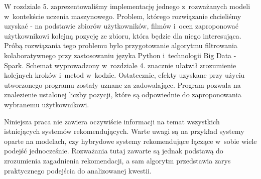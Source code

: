 \documentclass[12pt,a4paper]{report}
\begin{document}
W rozdziale 5. zaprezentowaliśmy implementację jednego z~rozważanych modeli w~kontekście uczenia maszynowego. Problem, którego rozwiązanie chcieliśmy uzyskać - na podstawie zbiorów użytkowników, filmów i~ocen zaproponować użytkownikowi kolejną pozycję ze zbioru, która będzie dla niego interesująca. Próbą rozwiązania tego problemu było przygotowanie algorytmu filtrowania kolaboratywnego przy zastosowaniu języka Python i~technologii Big Data - Spark. Schemat wyprowadzony w~rozdziale 4. znacznie ułatwił zrozumienie kolejnych kroków i~metod w~kodzie. Ostatecznie, efekty uzyskane przy użyciu utworzonego programu zostały uznane za zadowalające. Program pozwala na znalezienie ustalonej liczby pozycji, które są odpowiednie do zaproponowania wybranemu użytkownikowi. 

Niniejsza praca nie zawiera oczywiście informacji na temat wszystkich istniejących systemów rekomendujących. Warte uwagi są na przykład systemy oparte na modelach, czy hybrydowe systemy rekomendujące łączące w~sobie wiele podejść jednocześnie. Rozważania tutaj zawarte są jednak podstawą do zrozumienia zagadnienia rekomendacji, a sam algorytm przedstawia zarys praktycznego podejścia do analizowanej kwestii.



\end{document}
